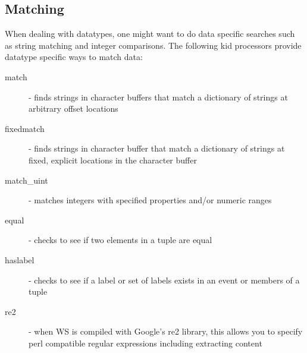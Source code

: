 \documentclass[11pt]{article}
\begin{document}
\subsection {Matching}
When dealing with datatypes, one might want to do data specific searches such as string matching and
integer comparisons.  The following kid processors provide datatype specific ways to match data:
\begin{description}
\item [match] - finds strings in character buffers that match a dictionary of strings at arbitrary
offset locations
\item [fixedmatch] - finds strings in character buffer that match a dictionary of strings at fixed,
explicit locations in the character buffer
\item [match\_uint] - matches integers with specified properties and/or numeric ranges
\item [equal] - checks to see if two elements in a tuple are equal
\item [haslabel] - checks to see if a label or set of labels exists in an event or members of a tuple
\item [re2] - when WS is compiled with Google's re2 library, this allows you to specify perl
compatible regular expressions including extracting content
\end{description}
\end{document}
